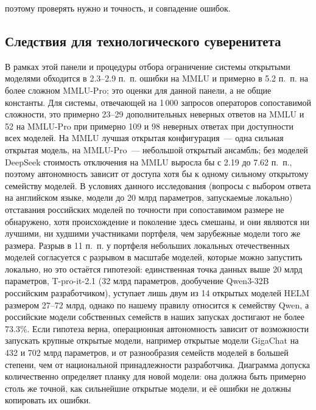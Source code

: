 \documentclass[preprint,12pt,authoryear]{elsarticle}
\begin{document}
поэтому проверять нужно и точность, и совпадение ошибок.

\subsection{Следствия для технологического суверенитета}
В рамках этой панели и процедуры отбора ограничение системы открытыми моделями обходится в 2.3--2.9 п.~п. ошибки на MMLU и примерно в 5.2 п.~п. на более сложном MMLU-Pro; это оценки для данной панели, а не общие константы. Для системы, отвечающей на 1\,000 запросов операторов сопоставимой сложности, это примерно 23--29 дополнительных неверных ответов на MMLU и 52 на MMLU-Pro при примерно 109 и 98 неверных ответах при доступности всех моделей. На MMLU лучшая открытая конфигурация~--- одна сильная открытая модель, на MMLU-Pro~--- небольшой открытый ансамбль; без моделей DeepSeek стоимость отключения на MMLU выросла бы с 2.19 до 7.62 п.~п., поэтому автономность зависит от доступа хотя бы к одному сильному открытому семейству моделей. В условиях данного исследования (вопросы с выбором ответа на английском языке, модели до 20 млрд параметров, запускаемые локально) отставания российских моделей по точности при сопоставимом размере не обнаружено, хотя происхождение и поколение здесь смешаны, и они являются ни лучшими, ни худшими участниками портфеля, чем зарубежные модели того же размера. Разрыв в 11 п.~п. у портфеля небольших локальных отечественных моделей согласуется с разрывом в масштабе моделей, которые можно запустить локально, но это остаётся гипотезой: единственная точка данных выше 20 млрд параметров, T-pro-it-2.1 (32 млрд параметров, дообучение Qwen3-32B российским разработчиком), уступает лишь двум из 14 открытых моделей HELM размером 27--72 млрд, однако по нашему правилу относится к семейству Qwen, а российские модели собственных семейств в наших запусках достигают не более 73.3\%. Если гипотеза верна, операционная автономность зависит от возможности запускать крупные открытые модели, например открытые модели GigaChat на 432 и 702 млрд параметров, и от разнообразия семейств моделей в большей степени, чем от национальной принадлежности разработчика. Диаграмма допуска количественно определяет планку для новой модели: она должна быть примерно столь же точной, как сильнейшие открытые модели, и её ошибки не должны копировать их ошибки.
\end{document}
